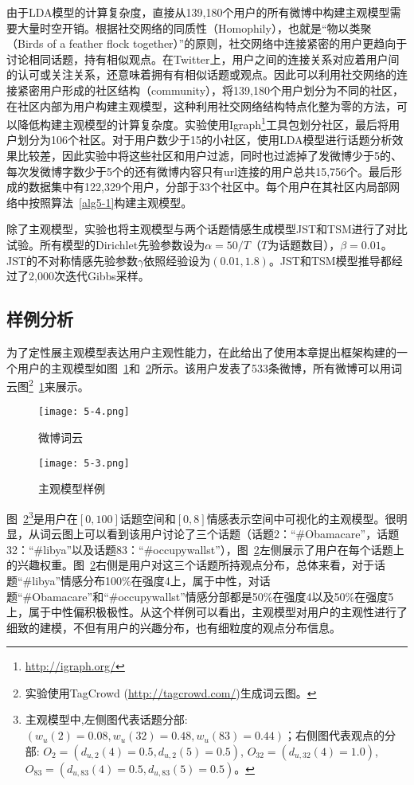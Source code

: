 由于LDA模型的计算复杂度，直接从139,180个用户的所有微博中构建主观模型需要大量时空开销。根据社交网络的同质性（Homophily），也就是“物以类聚（Birds of a feather flock together）”的原则，社交网络中连接紧密的用户更趋向于讨论相同话题，持有相似观点。在Twitter上，用户之间的连接关系对应着用户间的认可或关注关系，还意味着拥有有相似话题或观点。因此可以利用社交网络的连接紧密用户形成的社区结构（community），将139,180个用户划分为不同的社区，在社区内部为用户构建主观模型，这种利用社交网络结构特点化整为零的方法，可以降低构建主观模型的计算复杂度。实验使用Igraph\footnote{\url{http://igraph.org/}}工具包划分社区，最后将用户划分为106个社区。对于用户数少于15的小社区，使用LDA模型进行话题分析效果比较差，因此实验中将这些社区和用户过滤，同时也过滤掉了发微博少于5的、每次发微博字数少于5个的还有微博内容只有url连接的用户总共15,756个。最后形成的数据集中有122,329个用户，分部于33个社区中。每个用户在其社区内局部网络中按照算法~\ref{alg5-1}构建主观模型。

除了主观模型，实验也将主观模型与两个话题情感生成模型JST和TSM进行了对比试验。所有模型的Dirichlet先验参数设为$ \alpha=50/T $（$ T $为话题数目），$ \beta=0.01 $。JST的不对称情感先验参数$ \gamma $依照经验设为$ (0.01, 1.8) $。JST和TSM模型推导都经过了2,000次迭代Gibbs采样。

\subsection{样例分析}
为了定性展主观模型表达用户主观性能力，在此给出了使用本章提出框架构建的一个用户的主观模型如图~\ref{fig5:a}和~\ref{fig5:b}所示。该用户发表了533条微博，所有微博可以用词云图\footnote{实验使用TagCrowd (\url{http://tagcrowd.com/})生成词云图。}~\ref{fig5:a}来展示。

\begin{figure}[htb]
\centering
\texttt{[image: 5-4.png]}
\caption{微博词云}
\label{fig5:a}
\end{figure}

\begin{figure}[htb]
\centering
\texttt{[image: 5-3.png]}
\caption{主观模型样例}
\label{fig5:b}
\end{figure}

图~\ref{fig5:b}\footnote{主观模型中,左侧图代表话题分部: $ (  w_{u}\left( 2 \right)=0.08,w_{u}\left( 32 \right)=0.48, w_{u}\left( 83 \right)=0.44)  $；右侧图代表观点的分部: $ O_{2}=( d_{u,2} \left( 4 \right)=0.5, d_{u,2} \left( 5 \right)=0.5)$, $O_{32}=(d_{u,32} \left( 4 \right)=1.0) $, $ O_{83}=( d_{u,83} \left( 4 \right)=0.5, d_{u,83} \left( 5 \right)=0.5 ) $。}是用户在$ [0,100] $话题空间和$ [0,8] $情感表示空间中可视化的主观模型。很明显，从词云图上可以看到该用户讨论了三个话题（话题2：``\#Obamacare''，话题32：``\#libya''以及话题83：``\#occupywallst''），图~\ref{fig5:b}左侧展示了用户在每个话题上的兴趣权重。图~\ref{fig5:b}右侧是用户对这三个话题所持观点分布，总体来看，对于话题``\#libya''情感分布100\%在强度4上，属于中性，对话题``\#Obamacare''和``\#occupywallst''情感分部都是50\%在强度4以及50\%在强度5上，属于中性偏积极极性。从这个样例可以看出，主观模型对用户的主观性进行了细致的建模，不但有用户的兴趣分布，也有细粒度的观点分布信息。

